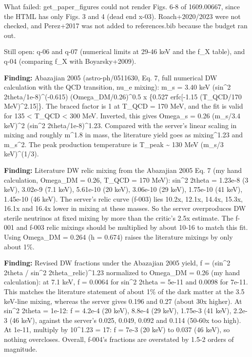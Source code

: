 \documentclass[11pt,a4paper]{article}
\begin{document}
What failed: get\_paper\_figures could not render Figs. 6-8 of 1609.00667, since the HTML has only Figs. 3 and 4 (dead end x-03). Roach+2020/2023 were not checked, and Perez+2017 was not added to references.bib because the budget ran out.

Still open: q-06 and q-07 (numerical limits at 29-46 keV and the f\_X table), and q-04 (comparing f\_X with Boyarsky+2009).

\textbf{Finding:} Abazajian 2005 (astro-ph/0511630, Eq. 7, full numerical DW calculation with the QCD transition, nu\_e mixing): m\_s = 3.40 keV (sin\textasciicircum{}2 2theta/1e-8)\textasciicircum{}(-0.615) (Omega\_DM/0.26)\textasciicircum{}0.5 x \{0.527 erfc[-1.15 (T\_QCD/170 MeV)\textasciicircum{}2.15]\}. The braced factor is 1 at T\_QCD = 170 MeV, and the fit is valid for 135 \textless{} T\_QCD \textless{} 300 MeV. Inverted, this gives Omega\_s = 0.26 (m\_s/3.4 keV)\textasciicircum{}2 (sin\textasciicircum{}2 2theta/1e-8)\textasciicircum{}1.23. Compared with the server's linear scaling in mixing and roughly m\textasciicircum{}1.8 in mass, the literature yield goes as mixing\textasciicircum{}1.23 and m\_s\textasciicircum{}2. The peak production temperature is T\_peak \textasciitilde{} 130 MeV (m\_s/3 keV)\textasciicircum{}(1/3).

\textbf{Finding:} Literature DW relic mixing from the Abazajian 2005 Eq. 7 (my hand calculation, Omega\_DM = 0.26, T\_QCD = 170 MeV): sin\textasciicircum{}2 2theta = 1.23e-8 (3 keV), 3.02e-9 (7.1 keV), 5.61e-10 (20 keV), 3.06e-10 (29 keV), 1.75e-10 (41 keV), 1.45e-10 (46 keV). The server's relic curve (f-003) lies 10.2x, 12.1x, 14.4x, 15.3x, 16.1x and 16.4x lower in mixing at these masses. So the server overproduces DW sterile neutrinos at fixed mixing by more than the critic's 2.5x estimate. The f-001 and f-003 relic mixings should be multiplied by about 10-16 to match this fit. Using Omega\_DM = 0.264 (h = 0.674) raises the literature mixings by only about 1\%.

\textbf{Finding:} Revised DW fractions under the Abazajian 2005 yield, f = (sin\textasciicircum{}2 2theta / sin\textasciicircum{}2 2theta\_relic)\textasciicircum{}1.23 normalized to Omega\_DM = 0.26 (my hand calculation): at 7.1 keV, f = 0.0064 for sin\textasciicircum{}2 2theta = 5e-11 and 0.0098 for 7e-11. This matches the literature statement of about 1\% of the dark matter at the 3.5 keV-line mixing, whereas the server gives 0.196 and 0.27 (about 30x higher). At sin\textasciicircum{}2 2theta = 1e-12: f = 4.2e-4 (20 keV), 8.8e-4 (29 keV), 1.75e-3 (41 keV), 2.2e-3 (46 keV), against the server's 0.025, 0.049, 0.092 and 0.114 (50-60x too high). At 1e-11, multiply by 10\textasciicircum{}1.23 = 17: f = 7e-3 (20 keV) to 0.037 (46 keV), so nothing overcloses. Overall, f-004's fractions are overstated by 1.5-2 orders of magnitude.
\end{document}

